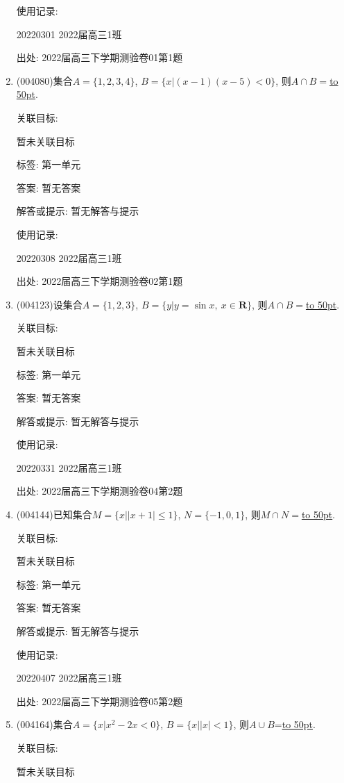 \documentclass[10pt,a4paper]{article}
\newcommand{\blank}[1]{\underline{\hbox to #1pt{}}}
\begin{document}
\begin{enumerate}[1.]
使用记录:

20220301	2022届高三1班	


出处: 2022届高三下学期测验卷01第1题
\item { (004080)}集合$A=\{1,2,3,4\}$, $B=\{x|(x-1)(x-5)<0\}$, 则$A\cap B=$\blank{50}.


关联目标:

暂未关联目标



标签: 第一单元

答案: 暂无答案

解答或提示: 暂无解答与提示

使用记录:

20220308	2022届高三1班	


出处: 2022届高三下学期测验卷02第1题
\item { (004123)}设集合$A=\{1,2,3\}$, $B=\{y|y=\sin x, \ x\in \mathbf{R}\}$, 则$A\cap B=$\blank{50}.


关联目标:

暂未关联目标



标签: 第一单元

答案: 暂无答案

解答或提示: 暂无解答与提示

使用记录:

20220331	2022届高三1班	


出处: 2022届高三下学期测验卷04第2题
\item { (004144)}已知集合$M=\{x||x+1|\le 1\}$, $N=\{-1,0,1\}$, 则$M\cap N=$\blank{50}.


关联目标:

暂未关联目标



标签: 第一单元

答案: 暂无答案

解答或提示: 暂无解答与提示

使用记录:

20220407	2022届高三1班	


出处: 2022届高三下学期测验卷05第2题
\item { (004164)}集合$A=\{x|x^2-2x<0\}$, $B=\{x||x|<1\}$, 则$A\cup B$=\blank{50}.


关联目标:

暂未关联目标




\end{enumerate}
\end{document}
